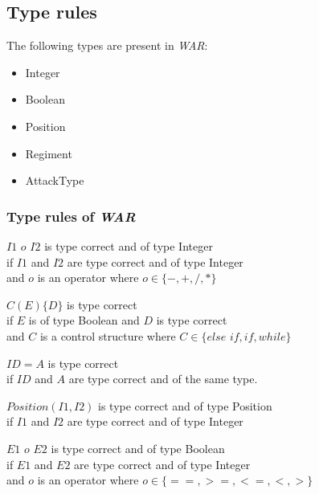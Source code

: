 \subsection{Type rules}
	The following types are present in \textit{WAR}: \\
	\begin{itemize}
		\item Integer
		\item Boolean
		\item Position
		\item Regiment
		\item AttackType
	\end{itemize}
		
	\subsubsection{Type rules of \textit{WAR}}

	\begin{typerule} 
		$I1$ $ o $ $I2$ is type correct and of type Integer \\
		if $I1$ and $I2$ are type correct and of type Integer \\
		and $o$ is an operator where $o\in \{-,+,/,* \}$
	\end{typerule}
	\begin{typerule} 
		$C(E)\{D\}$ is type correct\\
		if $E$ is of type Boolean and $D$ is type correct \\
		and $C$ is a control structure where $C \in \{else$ $if, if, while\}$
	\end{typerule}
	\begin{typerule} 
		$ID = A$ is type correct\\
		if $ID$ and $A$ are type correct and of the same type.
	\end{typerule}
	\begin{typerule} 
		$Position(I1,I2)$ is type correct and of type Position\\
		if $I1$ and $I2$ are type correct and of type Integer
	\end{typerule}
	\begin{typerule} 
		$E1$ $ o $ $E2$ is type correct and of type Boolean\\
		if $E1$ and $E2$ are type correct and of type Integer \\
		and $o$ is an operator where $o\in \{ ==,>=,<=,<,> \}$
	\end{typerule}
	
	